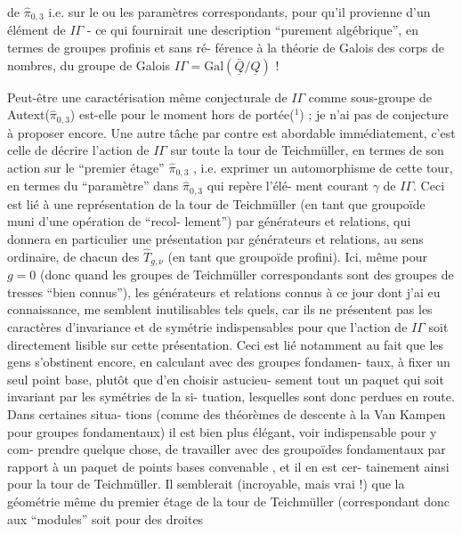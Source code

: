 
de $\hat{\pi}_{0,3}$ i.e. sur le ou les paramètres correspondants, pour qu'il
provienne d'un élément de $I\!\Gamma$ - ce qui fournirait une description
``purement algébrique'', en termes de groupes profinis et sans ré-%
férence à la théorie de Galois des corps de nombres, du groupe de
Galois $I\!\Gamma = \mathrm{Gal}(\bar{\underline{Q}}/\underline{Q})$ !

Peut-être une caractérisation même conjecturale de $I\!\Gamma$
comme sous-groupe de Autext($\hat{\pi}_{0,3}$) est-elle pour le moment hors de
portée($^1$) ; je n'ai pas de conjecture à proposer encore. Une autre
tâche par contre est abordable immédiatement, c'est celle de décrire
l'action de $I\!\Gamma$ sur toute la tour de Teichmüller, en termes de son
action sur le ``premier étage'' $\hat{\pi}_{0,3}$ , i.e. exprimer un automorphisme
de cette tour, en termes du ``paramètre'' dans $\hat{\pi}_{0,3}$ qui repère l'élé-%
ment courant $\gamma$ de $I\!\Gamma$. Ceci est lié à une représentation de la tour
de Teichmüller (en tant que groupoïde muni d'une opération de ``recol-%
lement'') par générateurs et relations, qui donnera en particulier
une présentation par générateurs et relations, au sens ordinaire, de
chacun des $\hat{T}_{g,\nu}$ (en tant que groupoïde profini). Ici, même pour
$g = 0$ (donc quand les groupes de Teichmüller correspondants sont
des groupes de tresses ``bien connus''), les générateurs et relations
connus à ce jour dont j'ai eu connaissance, me semblent inutilisables
tels quels, car ils ne présentent pas les caractères d'invariance et
de symétrie indispensables pour que l'action de $I\!\Gamma$ soit directement
lisible sur cette présentation. Ceci est lié notamment au fait que
les gens s'obstinent encore, en calculant avec des groupes fondamen-%
taux, à fixer un seul point base, plutôt que d'en choisir astucieu-%
sement tout un paquet qui soit invariant par les symétries de la si-%
tuation, lesquelles sont donc perdues en route. Dans certaines situa-%
tions (comme des théorèmes de descente à la Van Kampen pour groupes
fondamentaux) il est bien plus élégant, voir indispensable pour y com-%
prendre quelque chose, de travailler avec des groupoïdes fondamentaux
par rapport à un paquet de points bases convenable , et il en est cer-%
tainement ainsi pour la tour de Teichmüller. Il semblerait (incroyable,
mais vrai !) que la géométrie même du premier étage de la tour de
Teichmüller (correspondant donc aux ``modules'' soit pour des droites

